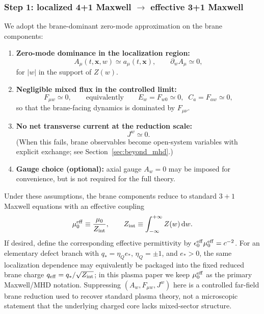 \documentclass[11pt]{article}
\newcommand{\x}{\mathbf{x}}     %
\newcommand{\Z}{Z}              %
\newcommand{\muzero}{\mu_0}
\newcommand{\muzeff}{\mu_0^{\rm eff}}
\newcommand{\Zint}{Z_{\rm int}}
\begin{document}
\subsubsection*{Step 1: localized 4+1 Maxwell \(\to\) effective 3+1 Maxwell}
We adopt the brane-dominant zero-mode approximation on the brane components:
\begin{enumerate}[leftmargin=1.6em]
\item \textbf{Zero-mode dominance in the localization region:}
\begin{equation}
A_\mu(t,\x,w)\simeq a_\mu(t,\x),
\qquad
\partial_w A_\mu \simeq 0,
\label{eq:zero_mode_assumption}
\end{equation}
for \(|w|\) in the support of \(\Z(w)\).

\item \textbf{Negligible mixed flux in the controlled limit:}
\begin{equation}
F_{\mu w}\simeq 0,
\qquad\text{equivalently}\qquad
E_w=F_{w0}\simeq 0,\;\; C_a=F_{aw}\simeq 0,
\label{eq:mixed_suppression_assumption}
\end{equation}
so that the brane-facing dynamics is dominated by \(F_{\mu\nu}\).

\item \textbf{No net transverse current at the reduction scale:}
\begin{equation}
J^w \simeq 0.
\label{eq:Jw_suppression_assumption}
\end{equation}
(When this fails, brane observables become open-system variables with explicit
exchange; see Section~\ref{sec:beyond_mhd}.)

\item \textbf{Gauge choice (optional):} axial gauge \(A_w=0\) may be imposed for
convenience, but is not required for the full theory.
\end{enumerate}

Under these assumptions, the brane components reduce to standard \(3+1\) Maxwell
equations with an effective coupling
\begin{equation}
\muzeff \equiv \frac{\muzero}{\Zint},
\qquad
\Zint \equiv \int_{-\infty}^{+\infty}\Z(w)\,\dd w.
\label{eq:mu0eff_repeat}
\end{equation}
If desired, define the corresponding effective permittivity by
\(\epsilon_0^{\rm eff}\mu_0^{\rm eff}=c^{-2}\).
For an elementary defect branch with \(q_*=\eta_Q e_*\), \(\eta_Q=\pm1\), and
\(e_*>0\), the same localization dependence may equivalently be packaged into the
fixed reduced brane charge \(q_{\rm eff}=q_*/\sqrt{\Zint}\); in this plasma paper
we keep \(\mu_0^{\rm eff}\) as the primary Maxwell/MHD notation.
Suppressing \((A_w,F_{\mu w},J^w)\) here is a controlled far-field brane reduction
used to recover standard plasma theory, not a microscopic statement that the
underlying charged core lacks mixed-sector structure.
\end{document}
